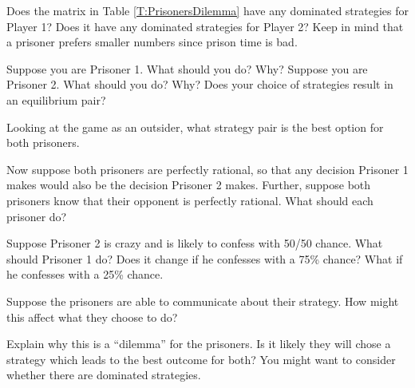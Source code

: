 \begin{xca}\label{E:PDdomstrat}
Does the matrix in Table \ref{T:PrisonersDilemma} have any dominated strategies for Player 1? Does it have any dominated strategies for Player 2? Keep in mind that a prisoner prefers smaller numbers since prison time is bad.
\end{xca}

\begin{xca}\label{E:PDbeststrat}
Suppose you are Prisoner 1. What should you do? Why? Suppose you are Prisoner 2. What should you do? Why? Does your choice of strategies result in an equilibrium pair?
\end{xca}

\begin{xca}\label{E:PDbestforall}
Looking at the game as an outsider, what strategy pair is the best option for both prisoners. 
\end{xca}

\begin{xca}\label{E:PDsamedecision}
Now suppose both prisoners are perfectly rational, so that any decision Prisoner 1 makes would also be the decision Prisoner 2 makes. Further, suppose both prisoners know that their opponent is perfectly rational. What should each prisoner do?
\end{xca}

\begin{xca}\label{E:PDrandomP2}
Suppose Prisoner 2 is crazy and is likely to confess with 50/50 chance. What should Prisoner 1 do? Does it change if he confesses with a 75\% chance? What if he confesses with a 25\% chance.
\end{xca}

\begin{xca}\label{E:PDcommunicate}
Suppose the prisoners are able to communicate about their strategy. How might this affect what they choose to do?
\end{xca}

\begin{xca}\label{E:PDdilemma}
Explain why this is a ``dilemma'' for the prisoners. Is it likely they will chose a strategy which leads to the best outcome for both? You might want to consider whether there are dominated strategies.
\end{xca}

